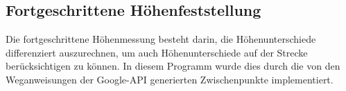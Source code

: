 \subsection{Fortgeschrittene Höhenfeststellung}
\label{sec:advanced-elevation}
Die fortgeschrittene Höhenmessung besteht darin, die Höhenunterschiede differenziert auszurechnen, um auch Höhenunterschiede auf der Strecke berücksichtigen zu können. In diesem Programm wurde dies durch die von den Weganweisungen der Google-API generierten Zwischenpunkte  implementiert.